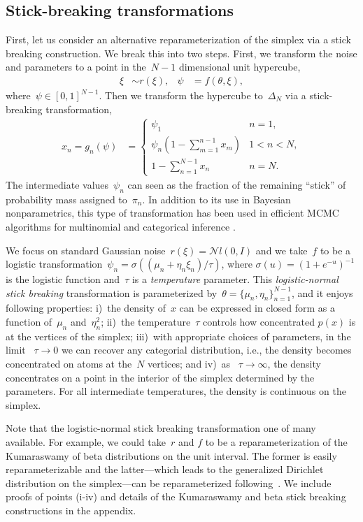 \documentclass[twoside]{article}
\begin{document}
\subsection{Stick-breaking transformations}
First, let us consider an alternative reparameterization of the simplex
via a stick breaking construction. We break this into two steps. First,
we transform the noise and parameters to a point in the~${N-1}$ dimensional
unit hypercube,
\begin{align}
  \xi &\sim r(\xi), & 
  \psi & = f(\theta, \xi),
\end{align}
where~${\psi \in [0,1]^{N-1}}$. Then we transform the hypercube to~$\Delta_N$
  via a stick-breaking transformation,
\begin{align}
  x_n = g_n(\psi)
  &= \begin{cases}
    \psi_1 & n=1, \\
    \psi_n \left(1- \sum_{m=1}^{n-1} x_m \right) & 1 < n < N, \\
    1- \sum_{n=1}^{N-1} x_n & n=N.
    \end{cases}
\end{align}
The intermediate values~$\psi_n$ can seen as the fraction of the
remaining ``stick'' of probability mass assigned to~${\pi}_n$.  In
addition to its use in Bayesian nonparametrics, this type of
transformation has been used in efficient MCMC algorithms for
multinomial and categorical inference \citep{linderman2015dependent}.

We focus on standard Gaussian noise~${r(\xi) = \mathcal{N}l(0,I)}$
and we take~$f$ to be a logistic
transformation~${\psi_n = \sigma((\mu_n + \eta_n \xi_n) / \tau)}$,
where ${\sigma(u) = (1+e^{-u})^{-1}}$ is the logistic function
and~$\tau$ is a \emph{temperature} parameter.  This
\emph{logistic-normal stick breaking} transformation is parameterized
by~${\theta = \{\mu_n, \eta_n\}_{n=1}^{N-1}}$, and it enjoys following
properties: i)~the density of~$x$ can be expressed in closed form as a
function of~$\mu_n$ and~$\eta_n^2$; ii)~the temperature~$\tau$
controls how concentrated $p(x)$ is at the vertices of the simplex;
iii)~with appropriate choices of parameters, in the limit
~$\tau \to 0$ we can recover any categorial distribution, i.e., the
density becomes concentrated on atoms at the~$N$ vertices; and iv)~as
~$\tau \to \infty$, the density concentrates on a point in the
interior of the simplex determined by the parameters. For all
intermediate temperatures, the density is continuous on the simplex.

Note that the logistic-normal stick breaking transformation one of
many available. For example, we could take~$r$ and $f$ to be a
reparameterization of the Kumaraswamy of beta distributions on the
unit interval. The former is easily reparameterizable and the
latter---which leads to the generalized Dirichlet distribution on the
simplex---can be reparameterized following~\citet{naesseth2017reparameterization}. We include proofs of points (i-iv) and details of the Kumaraswamy and beta stick breaking constructions in the appendix.
\end{document}
